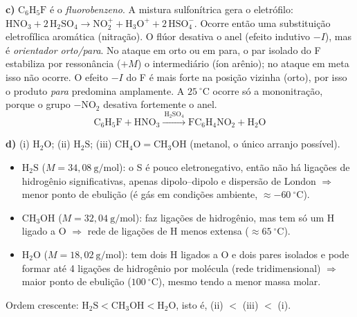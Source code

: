 \documentclass{article}%
\begin{document}
\medskip
\textbf{c)} $\text{C}_6\text{H}_5\text{F}$ é o \emph{fluorobenzeno}. A mistura sulfonítrica
gera o eletrófilo:
$\text{HNO}_3+2\,\text{H}_2\text{SO}_4\rightarrow\text{NO}_2^{+}+\text{H}_3\text{O}^{+}+2\,\text{HSO}_4^{-}$.
Ocorre então uma substituição eletrofílica aromática (nitração). O flúor desativa o anel (efeito
indutivo $-I$), mas é \emph{orientador orto/para}. No ataque em orto ou em para, o par isolado do F
estabiliza por ressonância ($+M$) o intermediário (íon arênio); no ataque em meta isso não ocorre.
O efeito $-I$ do F é mais forte na posição vizinha (orto), por isso o produto
\emph{para} predomina amplamente. A $25\ ^\circ\text{C}$ ocorre só a mononitração, porque o grupo
$-\text{NO}_2$ desativa fortemente o anel.
\[
\text{C}_6\text{H}_5\text{F}+\text{HNO}_3\xrightarrow{\ \text{H}_2\text{SO}_4\ }
\text{F}\text{C}_6\text{H}_4\text{NO}_2+\text{H}_2\text{O}
\]
\begin{center}
\end{center}

\medskip
\textbf{d)} (i) $\text{H}_2\text{O}$; (ii) $\text{H}_2\text{S}$; (iii) $\text{CH}_4\text{O}=\text{CH}_3\text{OH}$ (metanol, o único arranjo possível).
\begin{itemize}
\item $\text{H}_2\text{S}$ ($M=34{,}08\ \text{g/mol}$): o S é pouco eletronegativo, então não há ligações de
hidrogênio significativas, apenas dipolo--dipolo e dispersão de London $\Rightarrow$ menor ponto de
ebulição (é gás em condições ambiente, $\approx -60\ ^\circ\text{C}$).
\item $\text{CH}_3\text{OH}$ ($M=32{,}04\ \text{g/mol}$): faz ligações de hidrogênio, mas tem só
um H ligado a O $\Rightarrow$ rede de ligações de H menos extensa ($\approx 65\ ^\circ\text{C}$).
\item $\text{H}_2\text{O}$ ($M=18{,}02\ \text{g/mol}$): tem dois H ligados a O e dois pares isolados e
pode formar até 4 ligações de hidrogênio por molécula (rede tridimensional) $\Rightarrow$ maior
ponto de ebulição ($100\ ^\circ\text{C}$), mesmo tendo a menor massa molar.
\end{itemize}
Ordem crescente: $\text{H}_2\text{S}<\text{CH}_3\text{OH}<\text{H}_2\text{O}$, isto é, (ii) $<$ (iii) $<$ (i).
\end{document}
